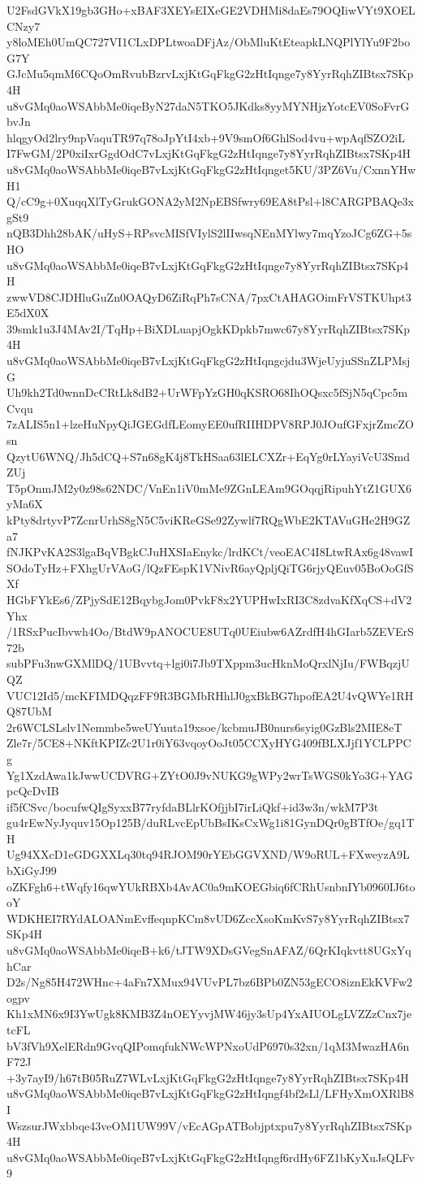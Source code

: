 U2FsdGVkX19gb3GHo+xBAF3XEYsEIXeGE2VDHMi8daEs79OQIiwVYt9XOELCNzy7
y8loMEh0UmQC727VI1CLxDPLtwoaDFjAz/ObMluKtEteapkLNQPlYlYu9F2boG7Y
GJcMu5qmM6CQoOmRvubBzrvLxjKtGqFkgG2zHtIqnge7y8YyrRqhZIBtsx7SKp4H
u8vGMq0aoWSAbbMe0iqeByN27daN5TKO5JKdks8yyMYNHjzYotcEV0SoFvrGbvJn
hlqgyOd2lry9npVaquTR97q78oJpYtI4xb+9V9smOf6GhlSod4vu+wpAqfSZO2iL
I7FwGM/2P0xiIxrGgdOdC7vLxjKtGqFkgG2zHtIqnge7y8YyrRqhZIBtsx7SKp4H
u8vGMq0aoWSAbbMe0iqeB7vLxjKtGqFkgG2zHtIqnget5KU/3PZ6Vu/CxnnYHwH1
Q/cC9g+0XuqqXlTyGrukGONA2yM2NpEBSfwry69EA8tPsl+l8CARGPBAQe3xgSt9
nQB3Dhh28bAK/uHyS+RPsvcMISfVIylS2lIIwsqNEnMYlwy7mqYzoJCg6ZG+5sHO
u8vGMq0aoWSAbbMe0iqeB7vLxjKtGqFkgG2zHtIqnge7y8YyrRqhZIBtsx7SKp4H
zwwVD8CJDHluGuZn0OAQyD6ZiRqPh7sCNA/7pxCtAHAGOimFrVSTKUhpt3E5dX0X
39smk1u3J4MAv2I/TqHp+BiXDLuapjOgkKDpkb7mwc67y8YyrRqhZIBtsx7SKp4H
u8vGMq0aoWSAbbMe0iqeB7vLxjKtGqFkgG2zHtIqngcjdu3WjeUyjuSSnZLPMsjG
Uh9kh2Td0wnnDcCRtLk8dB2+UrWFpYzGH0qKSRO68IhOQsxc5fSjN5qCpc5mCvqu
7zALIS5n1+lzeHuNpyQiJGEGdfLEomyEE0ufRIIHDPV8RPJ0JOufGFxjrZmcZOsn
QzytU6WNQ/Jh5dCQ+S7n68gK4j8TkHSaa63lELCXZr+EqYg0rLYayiVcU3SmdZUj
T5pOnmJM2y0z98s62NDC/VnEn1iV0mMe9ZGnLEAm9GOqqjRipuhYtZ1GUX6yMa6X
kPty8drtyvP7ZcnrUrhS8gN5C5viKReGSe92Zywlf7RQgWbE2KTAVuGHe2H9GZa7
fNJKPvKA2S3lgaBqVBgkCJuHXSIaEnykc/lrdKCt/veoEAC4I8LtwRAx6g48vawI
SOdoTyHz+FXhgUrVAoG/lQzFEspK1VNivR6ayQpljQiTG6rjyQEuv05BoOoGfSXf
HGbFYkEs6/ZPjySdE12BqybgJom0PvkF8x2YUPHwIxRI3C8zdvaKfXqCS+dV2Yhx
/1RSxPucIbvwh4Oo/BtdW9pANOCUE8UTq0UEiubw6AZrdfH4hGIarb5ZEVErS72b
subPFu3nwGXMlDQ/1UBvvtq+lgi0i7Jb9TXppm3ucHknMoQrxlNjIu/FWBqzjUQZ
VUC12Id5/mcKFIMDQqzFF9R3BGMbRHhlJ0gxBkBG7hpofEA2U4vQWYe1RHQ87UbM
2r6WCLSLslv1Nemmbe5weUYuuta19xsoe/kcbmuJB0nurs6syig0GzBls2MIE8eT
Zle7r/5CE8+NKftKPIZc2U1r0iY63vqoyOoJt05CCXyHYG409fBLXJjf1YCLPPCg
Yg1XzdAwa1kJwwUCDVRG+ZYtO0J9vNUKG9gWPy2wrTsWGS0kYo3G+YAGpcQcDvIB
if5fCSvc/bocufwQIgSyxxB77ryfdaBLlrKOfjjbI7irLiQkf+id3w3n/wkM7P3t
gu4rEwNyJyquv15Op125B/duRLvcEpUbBsIKsCxWg1i81GynDQr0gBTfOe/gq1TH
Ug94XXcD1eGDGXXLq30tq94RJOM90rYEbGGVXND/W9oRUL+FXweyzA9LbXiGyJ99
oZKFgh6+tWqfy16qwYUkRBXb4AvAC0a9mKOEGbiq6fCRhUsnbnIYb0960IJ6tooY
WDKHEI7RYdALOANmEvffeqnpKCm8vUD6ZccXsoKmKvS7y8YyrRqhZIBtsx7SKp4H
u8vGMq0aoWSAbbMe0iqeB+k6/tJTW9XDsGVegSnAFAZ/6QrKIqkvtt8UGxYqhCar
D2s/Ng85H472WHnc+4aFn7XMux94VUvPL7bz6BPb0ZN53gECO8iznEkKVFw2ogpv
Kh1xMN6x9I3YwUgk8KMB3Z4nOEYyvjMW46jy3sUp4YxAIUOLgLVZZzCnx7jetcFL
bV3fVh9XelERdn9GvqQIPomqfukNWcWPNxoUdP6970s32xn/1qM3MwazHA6nF72J
+3y7ayI9/h67tB05RuZ7WLvLxjKtGqFkgG2zHtIqnge7y8YyrRqhZIBtsx7SKp4H
u8vGMq0aoWSAbbMe0iqeB7vLxjKtGqFkgG2zHtIqngf4bf2sLl/LFHyXmOXRlB8I
WszsurJWxbbqe43veOM1UW99V/vEcAGpATBobjptxpu7y8YyrRqhZIBtsx7SKp4H
u8vGMq0aoWSAbbMe0iqeB7vLxjKtGqFkgG2zHtIqngf6rdHy6FZ1bKyXuJsQLFv9

